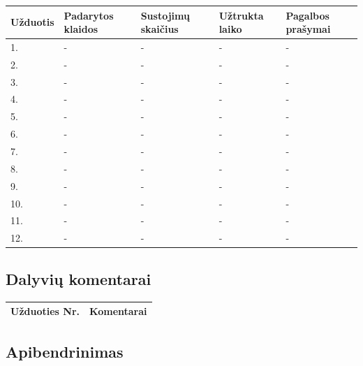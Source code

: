 \documentclass[oneside]{VUMIFPSkursinis}
\begin{document}
\begin{center}
\begin{table}[!pht]
\begin{tabular}{ |p{1.8cm} | p{3.4cm} | p{3.4cm} | p{2.5cm} | p{3.5cm}|}
	\hline
	Užduotis&Padarytos klaidos&Sustojimų skaičius&Užtrukta laiko&Pagalbos prašymai\\ \hline
1.&-&-&-&- \\ \hline
2.&-&-&-&- \\ \hline
3.&-&-&-&- \\ \hline
4.&-&-&-&- \\ \hline
5.&-&-&-&- \\ \hline
6.&-&-&-&- \\ \hline
7.&-&-&-&- \\ \hline
8.&-&-&-&- \\ \hline
9.&-&-&-&- \\ \hline
10.&-&-&-&- \\ \hline
11.&-&-&-&- \\ \hline
12.&-&-&-&- \\ \hline
\end{tabular}
\end{table}
\vspace{0.7cm}
\end{center}
\subsection{Dalyvių komentarai}
\begin{center}
	\begin{tabular}{ |p{3cm}| p{12cm} |}
	\hline
Užduoties Nr.&Komentarai\\ \hline
	\end{tabular}
\end{center}
\subsection{Apibendrinimas}
\end{document}
